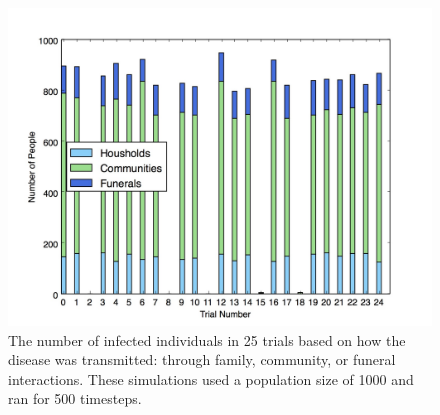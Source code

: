 \begin{figure}
  \centering
  \includegraphics[width=.75\textwidth]{infecttypes}
  \caption{The number of infected individuals in 25 trials based on how the disease was transmitted: through family, community, or funeral interactions. These simulations used a population size of 1000 and ran for 500 timesteps.}
\end{figure}
